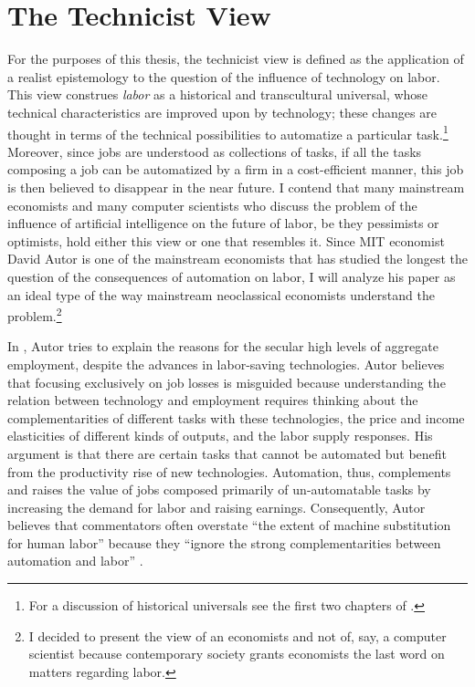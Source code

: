 \documentclass[version=last,draft=false,paper=A4,portrait,twoside=true,twocolumn=false,headinclude=false,footinclude=false,mpinclude=true,fontsize=12,BCOR=20mm,DIV=calc,pagesize=auto,open=right,chapterprefix=true,numbers=autoendperiod,headsepline=false,headings=twolinechapter,parskip=false]{scrbook}
\begin{document}
\section{The Technicist View}
\label{sec:org4ea58bd}
For the purposes of this thesis, the technicist view is defined as the
application of a realist epistemology to the question of the influence of
technology on labor. This view construes \emph{labor} as a historical and
transcultural universal, whose technical characteristics are improved upon
by technology; these changes are thought in terms of the technical
possibilities to automatize a particular task.\footnote{For a discussion of historical universals see the first two chapters
of \textcite{foucault2004}.} Moreover, since jobs
are understood as collections of tasks, if all the tasks composing a job
can be automatized by a firm in a cost-efficient manner, this job is then
believed to disappear in the near future. I contend that many mainstream
economists and many computer scientists who discuss the problem of the
influence of artificial intelligence on the future of labor, be they
pessimists or optimists, hold either this view or one that resembles it.
Since MIT economist David Autor is one of the mainstream economists that
has studied the longest the question of the consequences of automation on
labor, I will analyze his paper  as an ideal type of the
way mainstream neoclassical economists understand the problem.\footnote{I decided to present the view of an economists and not of, say, a
computer scientist because contemporary society grants economists the last
word on matters regarding labor.}


In , Autor tries to explain the reasons for the secular
high levels of aggregate employment, despite the advances in labor-saving
technologies. Autor believes that focusing exclusively on job losses is
misguided because understanding the relation between technology and
employment requires thinking about the complementarities of different tasks
with these technologies, the price and income elasticities of different
kinds of outputs, and the labor supply responses. His argument is that
there are certain tasks that cannot be automated but benefit from the
productivity rise of new technologies. Automation, thus, complements and
raises the value of jobs composed primarily of un-automatable tasks by
increasing the demand for labor and raising earnings. Consequently, Autor
believes that commentators often overstate ``the extent of machine
substitution for human labor'' because they ``ignore the strong
complementarities between automation and labor'' \autocite[p.
5]{autor2015}.
\end{document}

